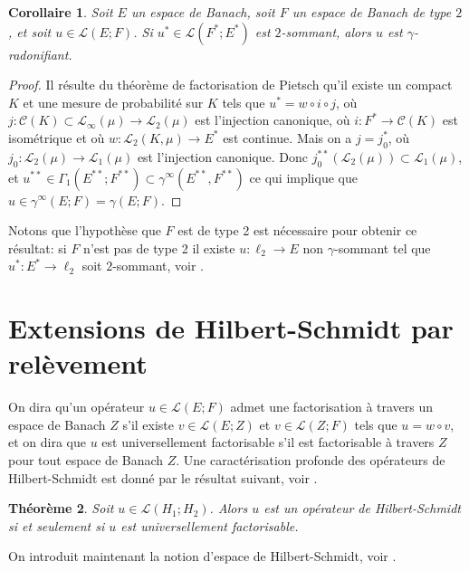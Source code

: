 \documentclass{smfart}
\theoremstyle{plain}
\newtheorem{theorem}{Théorème}[section]
\newtheorem{corollary}[theorem]{Corollaire}
\theoremstyle{definition}
\newcommand {\ELL} {{\mathcal L}}
\newcommand {\BOUNDED} {{\mathcal L}}
\begin{document}
\begin{corollary} \label{cor:u-ast-2-sommant-u-gamma} Soit $E$ un
  espace de Banach, soit $F$ un espace de Banach de type $2$, et soit
  $u\in \BOUNDED(E; F)$. Si $u^* \in \BOUNDED(F^{*}; E^*)$ est
  $2$-sommant, alors $u$ est $\gamma$-radonifiant.
\end{corollary}

\begin{proof} Il résulte du théorème de factorisation de Pietsch
  qu'il existe un compact $K$ et une mesure de probabilité sur $K$
  tels que $u^*=w\circ i \circ j$, où $j: {\mathcal C}(K)\subset
  \ELL_{\infty}(\mu) \to \ELL_2(\mu)$ est l'injection canonique, où
  $i:F^*\to {\mathcal C}(K)$ est isométrique et où $w: \ELL_2(K,\mu)
  \to E^*$ est continue. Mais on a $j=j_0^*$, où $j_0: \ELL_2(\mu)\to
  \ELL_1(\mu)$ est l'injection canonique. Donc $j_0^{**}(\ELL_2(\mu))\subset
  \ELL_1(\mu)$, et $u^{**} \in \Gamma_1(E^{**}; F^{**})\subset
  \gamma^{\infty}(E^{**},F^{**})$ ce qui implique que $u \in
  \gamma^{\infty}(E; F)=\gamma(E; F)$.
\end{proof}

\noindent Notons que l'hypothèse que $F$ est de type 2 est nécessaire
pour obtenir ce résultat: si $F$ n'est pas de type 2 il existe $u:
\ell_2 \to E$ non $\gamma$-sommant tel que $u^*: E^*\to \ell_2$ soit
$2$-sommant, voir \cite[Théorème~12.3]{jvn}.



\section{Extensions de Hilbert-Schmidt par relèvement}
\noindent On dira qu'un opérateur $u \in \BOUNDED(E; F)$ admet une
factorisation à travers un espace de Banach $Z$ s'il existe $v \in
\BOUNDED(E;Z)$ et $v \in \BOUNDED(Z;F)$ tels que $u = w\circ
v$, et on dira que $u$ est universellement factorisable s'il est
factorisable à travers $Z$ pour tout espace de Banach $Z$. Une
caractérisation profonde des opérateurs de Hilbert-Schmidt est
donné par le résultat suivant, voir \cite[Théorème~19.2]{DJT}.

\begin{theorem} Soit $u \in \BOUNDED(H_1;H_2)$. Alors $u$ est un
  opérateur de Hilbert-Schmidt si et seulement si $u$ est
  universellement factorisable.
\end{theorem} 

\noindent On introduit maintenant la notion d'espace de Hilbert-Schmidt, voir
\cite[Chapitre 19]{DJT}.
\end{document}
